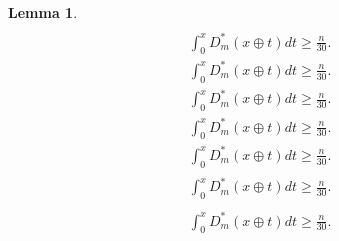 \documentclass{amsart}
\newtheorem{lemma}{Lemma}
\numberwithin{equation}{section}
\begin{document}
\begin{lemma}
{\begin{align*}
\end{align*}\fi   
{}\begin{align}\label{a20}
\int_0^x D_m^*(x\oplus t)dt\ge \frac{n}{30}.
\end{align}\fi    
{}\begin{gather*}\label{a20}
\int_0^x D_m^*(x\oplus t)dt\ge \frac{n}{30}.
\end{gather*}\fi  
{}\begin{gather}\label{a20}
\int_0^x D_m^*(x\oplus t)dt\ge \frac{n}{30}.
\end{gather}\fi   
{}\begin{multline*}\label{a20}
\int_0^x D_m^*(x\oplus t)dt\ge \frac{n}{30}.
\end{multline*}\fi  
{}\begin{multline}\label{a20}
\int_0^x D_m^*(x\oplus t)dt\ge \frac{n}{30}.
\end{multline}\fi  
{}\begin{multline*}\begin{split}\label{a20}
\int_0^x D_m^*(x\oplus t)dt\ge \frac{n}{30}.
\end{split}\end{multline*}\fi
{}\begin{multline}\begin{split}\label{a20}
\int_0^x D_m^*(x\oplus t)dt\ge \frac{n}{30}.
\end{split}\end{multline}\fi
}
\end{lemma}
\end{document}
